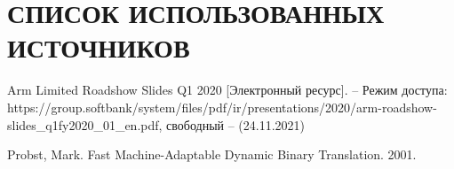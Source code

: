 \section*{СПИСОК ИСПОЛЬЗОВАННЫХ ИСТОЧНИКОВ}

\begingroup
\renewcommand{\section}[2]{}
\begin{thebibliography}{}	
	Arm Limited	Roadshow Slides	Q1 2020 [Электронный ресурс]. -- Режим доступа: https://group.softbank/system/files/pdf/ir/presentations/2020/arm-roadshow-slides\_q1fy2020\_01\_en.pdf,
	свободный -- (24.11.2021)
	
	Probst, Mark. Fast Machine-Adaptable Dynamic Binary Translation. 2001.
		
	
\end{thebibliography}
\endgroup

\pagebreak